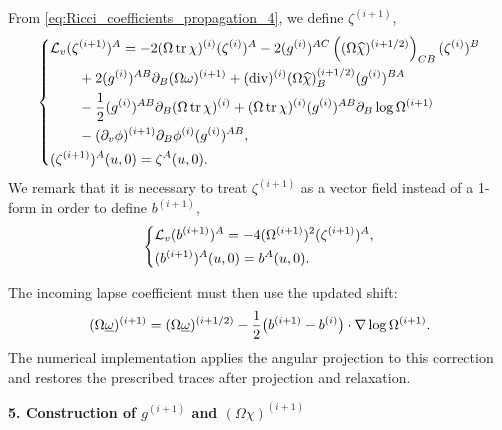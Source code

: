 From \eqref{eq:Ricci_coefficients_propagation_4}, we define $\zeta^{(i+1)}$,
\begin{equation} 
    \left\{\begin{aligned}
        &\mathcal L_v(\zeta^{(i+1)})^A=-2(\Omega\operatorname{tr}\chi)^{(i)}(\zeta^{(i)})^A-2(g^{(i)})^{AC}\left((\Omega\widehat\chi)^{(i+1/2)}\right)_{CB}(\zeta^{(i)})^B\\
        &\qquad+2(g^{(i)})^{AB}\partial_B(\Omega\omega)^{(i+1)} +(\operatorname{div})^{(i)}(\Omega\widehat\chi)^{(i+1/2)}_B(g^{(i)})^{BA} \\
        &\qquad-\frac{1}{2}(g^{(i)})^{AB}\partial_B(\Omega\operatorname{tr}\chi)^{(i)}+(\Omega\operatorname{tr}\chi)^{(i)}(g^{(i)})^{AB}\partial_B\log\Omega^{(i+1)}\\
        &\qquad-(\partial_v\phi)^{(i+1)}\partial_B\phi^{(i)}(g^{(i)})^{AB},\\
        &(\zeta^{(i+1)})^A(u,0)=\zeta^A(u,0).
    \end{aligned}\right.
\end{equation}
We remark that it is necessary to treat $\zeta^{(i+1)}$ as a vector field instead of a 1-form in order to define $b^{(i+1)}$,
\begin{equation} 
    \left\{\begin{aligned}
        &\mathcal L_v (b^{(i+1)})^A=-4(\Omega^{(i+1)})^2(\zeta^{(i+1)})^A,\\
        &(b^{(i+1)})^A(u,0)=b^A(u,0).
    \end{aligned}\right.
\end{equation}

The incoming lapse coefficient must then use the updated shift:
\begin{equation}
    (\Omega\underline\omega)^{(i+1)}=(\Omega\underline\omega)^{(i+1/2)}
    -\frac12\bigl(b^{(i+1)}-b^{(i)}\bigr)\cdot\nabla\log\Omega^{(i+1)}.
\end{equation}
The numerical implementation applies the angular projection to this correction
and restores the prescribed traces after projection and relaxation.

\noindent\textbf{5. Construction of $g^{(i+1)}$ and $(\Omega\chi)^{(i+1)}$}


